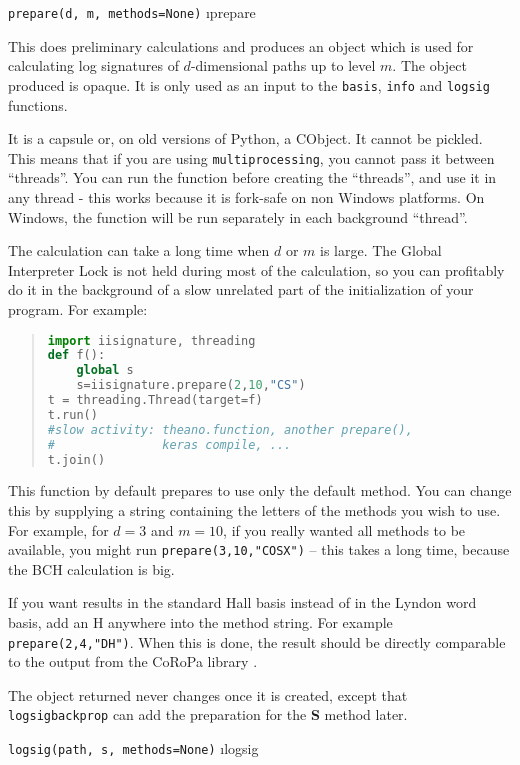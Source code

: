 \documentclass[a4paper]{extarticle}
\newenvironment{defn}{\begin{adjustwidth}{1cm}{}\ignorespaces}{\end{adjustwidth}\ignorespacesafterend}
\begin{document}
\verb!prepare(d, m, methods=None)! \i{prepare}
\nopagebreak \begin{defn}\nopagebreak 
This does preliminary calculations and produces an object which is used for calculating log signatures of $d$-dimensional paths up to level $m$. The object produced is opaque. It is only used as an input to the \verb|basis|, \verb|info| and \verb|logsig| functions. 

It is a capsule or, on old versions of Python, a CObject. It cannot be pickled. This means that if you are using \verb|multiprocessing|, you cannot pass it between ``threads''. You can run the function before creating the ``threads'', and use it in any thread - this works because it is fork-safe on non Windows platforms. On Windows, the function will be run separately in each background ``thread''.

The calculation can take a long time when $d$ or $m$ is large. The Global Interpreter Lock is not held during most of the calculation, so you can profitably do it in the background of a slow unrelated part of the initialization of your program. For example:
\begin{quotation}
\begin{lstlisting}[language=Python,keywordstyle=\bf]
import iisignature, threading
def f():
	global s
	s=iisignature.prepare(2,10,"CS")
t = threading.Thread(target=f)
t.run()
#slow activity: theano.function, another prepare(), 
#               keras compile, ...
t.join()
\end{lstlisting}
\end{quotation}

This function by default prepares to use only the default method. You can change this by supplying a string containing the letters of the methods you wish to use. For example, for $d=3$ and $m=10$, if you really wanted all methods to be available, you might run \verb|prepare(3,10,"COSX")| -- this takes a long time, because the BCH calculation is big. 

If you want results in the standard Hall basis instead of in the Lyndon word basis, add an H anywhere into the method string. For example \verb|prepare(2,4,"DH")|. When this is done, the result should be directly comparable to the output from the CoRoPa library \cite{coropa}.

The object returned never changes once it is created, except that \verb!logsigbackprop! can add the preparation for the \textbf{S} method later.

\end{defn}
\verb!logsig(path, s, methods=None)! \i{logsig}
\end{document}
